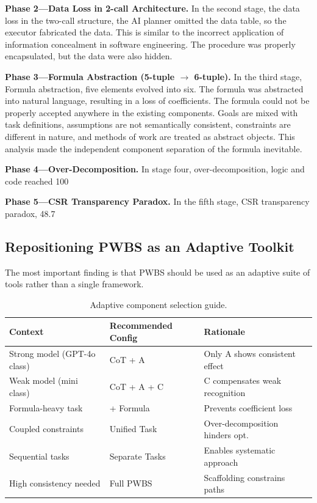 \documentclass[11pt,a4paper]{article}
\begin{document}
\textbf{Phase 2---Data Loss in 2-call Architecture.} In the second stage, the data loss in the two-call structure, the AI planner omitted the data table, so the executor fabricated the data. This is similar to the incorrect application of information concealment in software engineering. The procedure was properly encapsulated, but the data were also hidden.

\textbf{Phase 3---Formula Abstraction (5-tuple $\to$ 6-tuple).} In the third stage, Formula abstraction, five elements evolved into six. The formula was abstracted into natural language, resulting in a loss of coefficients. The formula could not be properly accepted anywhere in the existing components. Goals are mixed with task definitions, assumptions are not semantically consistent, constraints are different in nature, and methods of work are treated as abstract objects. This analysis made the independent component separation of the formula inevitable.

\textbf{Phase 4---Over-Decomposition.} In stage four, over-decomposition, logic and code reached 100%

\textbf{Phase 5---CSR Transparency Paradox.} In the fifth stage, CSR transparency paradox, 48.7%

\subsection{Repositioning PWBS as an Adaptive Toolkit}

The most important finding is that PWBS should be used as an adaptive suite of tools rather than a single framework.

\begin{table}[h]
\centering
\caption{Adaptive component selection guide.}
\label{tab:guide}
\begin{tabular}{lll}
\toprule
\textbf{Context} & \textbf{Recommended Config} & \textbf{Rationale} \\
\midrule
Strong model (GPT-4o class) & CoT + A & Only A shows consistent effect \\
Weak model (mini class) & CoT + A + C & C compensates weak recognition \\
Formula-heavy task & + Formula & Prevents coefficient loss \\
Coupled constraints & Unified Task & Over-decomposition hinders opt. \\
Sequential tasks & Separate Tasks & Enables systematic approach \\
High consistency needed & Full PWBS & Scaffolding constrains paths \\
\bottomrule
\end{tabular}
\end{table}
\end{document}
